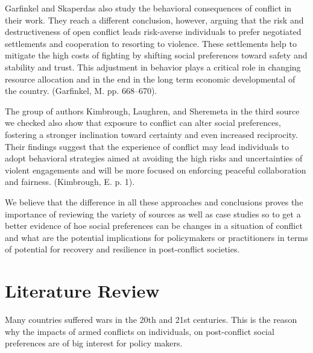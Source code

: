 \documentclass[14pt]{article}
\theoremstyle{remark}
\begin{document}
Garfinkel and Skaperdas also study the behavioral consequences of conflict in their work. They reach a different conclusion, however, arguing that the risk and destructiveness of open conflict leads risk-averse individuals to prefer negotiated settlements and cooperation to resorting to violence. These settlements help to mitigate the high costs of fighting by shifting social preferences toward safety and stability and trust. This adjustment in behavior plays a critical role in changing resource allocation and in the end in the long term economic developmental of the country. (Garfinkel, M. pp. 668--670).

The group of authors Kimbrough, Laughren, and Sheremeta in the third source we checked also show that exposure to conflict can alter social preferences, fostering a stronger inclination toward certainty and even increased reciprocity. Their findings suggest that the experience of conflict may lead individuals to adopt behavioral strategies aimed at avoiding the high risks and uncertainties of violent engagements and will be more focused on enforcing peaceful collaboration and fairness. (Kimbrough, E. p. 1).

We believe that the difference in all these approaches and conclusions proves the importance of reviewing the variety of sources as well as case studies so to get a better evidence of hoe social preferences can be changes in a situation of conflict and what are the potential implications for policymakers or practitioners in terms of potential for recovery and resilience in post-conflict societies.

\section{Literature Review}

Many countries suffered wars in the 20th and 21st centuries. This is the reason why the impacts of armed conflicts on individuals, on post-conflict social preferences are of big interest for policy makers.
\end{document}
